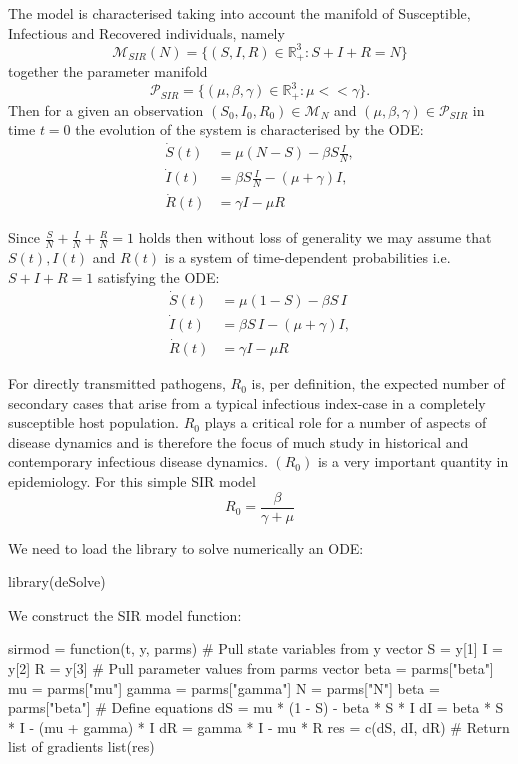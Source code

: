\documentclass[12pt]{article}\usepackage[]{graphicx}\usepackage[]{color}
\begin{document}
The model is characterised taking into account the manifold of Susceptible, Infectious and Recovered individuals, namely
$$
\mathcal{M}_{SIR}(N) = \{(S,I,R) \in \mathbb{R}_+^3 : S+I+R = N\}
$$
together the parameter manifold
$$
\mathcal{P}_{SIR} = \{(\mu,\beta,\gamma) \in \mathbb{R}_+^3: \mu << \gamma\}.
$$
Then for a given an observation $(S_0,I_0,R_0) \in \mathcal{M}_N$ and $(\mu,\beta,\gamma) \in \mathcal{P}_{SIR}$ in time $t=0$ the
evolution of the system is characterised by the ODE:
\begin{align}
\dot{S}(t) & = \mu(N-S)-\beta S \frac{I}{N}, \label{SIR1}\\
\dot{I}(t) & = \beta S \frac{I}{N} - (\mu + \gamma)I, \label{SIR2}\\
\dot{R}(t) & = \gamma I - \mu R \label{SIR3}
\end{align}

Since $\frac{S}{N}+\frac{I}{N}+\frac{R}{N}= 1$ holds then without loss of generality we may assume
that $S(t),I(t)$ and $R(t)$ is a system of time-dependent probabilities i.e. $S+I+R=1$ satisfying the ODE:
\begin{align}
\dot{S}(t) & = \mu(1-S)-\beta S \, I \label{PSIR1}\\
\dot{I}(t) & = \beta S \,I - (\mu + \gamma)I, \label{PSIR2}\\
\dot{R}(t) & = \gamma I - \mu R \label{PSIR3}
\end{align}


For directly transmitted pathogens, $R_0$ is, per definition, the expected number of secondary cases that arise from a typical infectious index-case in a completely susceptible host population. $R_0$ plays a critical role for a number of aspects of disease dynamics and is therefore the focus of much study in historical and contemporary infectious disease dynamics. $(R_0)$ is a very important quantity in epidemiology. For this simple SIR model $$R_0 = \frac{\beta}{\gamma + \mu}$$

We need to load the library to solve numerically an ODE:

\begin{Schunk}
\begin{Sinput}
library(deSolve)
\end{Sinput}
\end{Schunk}

We construct the SIR model function:

\begin{Schunk}
\begin{Sinput}
sirmod = function(t, y, parms) {
  # Pull state variables from y vector
  S = y[1]
  I = y[2]
  R = y[3]
  # Pull parameter values from parms vector beta = parms["beta"]
  mu = parms["mu"]
  gamma = parms["gamma"]
  N = parms["N"]
  beta = parms["beta"]
  # Define equations
  dS = mu * (1 - S) - beta * S * I
  dI = beta * S * I - (mu + gamma) * I 
  dR = gamma * I - mu * R
  res = c(dS, dI, dR)
  # Return list of gradients
  list(res)
}
\end{Sinput}
\end{Schunk}
\end{document}
